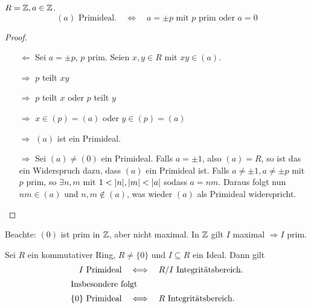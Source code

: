 \documentclass[12pt,a4paper]{scrartcl}
\begin{document}
\begin{bsp}
	$R = \mathbb Z, a\in \mathbb Z$. \[\text{$(a)$ Primideal.} \quad \Longleftrightarrow \quad \text{$a = \pm p$ mit $p$ prim oder $a = 0$} \]
\end{bsp}
\begin{proof}
	\leavevmode
	\begin{itemize}
		\item [\glqq $\Leftarrow$\grqq ]Sei $a = \pm p$, $p$ prim. Seien $x,y\in R$ mit $xy\in (a)$.

		$\Rightarrow$ $p$ teilt $xy$

		$\Rightarrow$ $p$ teilt $x$ oder $p$ teilt $y$

		$\Rightarrow$ $x\in (p) = (a)$ oder $y\in (p) = (a)$

		$\Rightarrow$ $(a)$ ist ein Primideal.
		\item [\glqq $\Rightarrow$\grqq ] Sei $(a) \neq (0)$ ein Primideal. Falls $a = \pm 1$, also $ (a) = R$, so ist das ein Widerspruch dazu, dass $(a)$ ein Primideal ist. Falls $a \neq \pm 1, a\neq \pm p$ mit $p$ prim, so $ \exists n, m$ mit $1<\lvert n\rvert, \lvert m\rvert<\lvert a\rvert$ sodass $a = nm$. 
		Daraus folgt nun $ nm\in (a)$ und $n,m\notin (a)$, was wieder $(a)$ als Primideal widerspricht.
	\end{itemize}
\end{proof}

\begin{bem}
	Beachte: $(0)$ ist prim in $\mathbb Z$, aber nicht maximal. In $\mathbb Z$ gilt \glqq$I$ maximal $\Rightarrow I $ prim\grqq.
\end{bem}


\begin{satz} \label{thm:primitb}
	Sei $R$ ein kommutativer Ring, $R\neq\{0\}$ und $ I\subseteq R$ ein Ideal. Dann gilt
	\begin{align*} I \text{ Primideal} \quad &\Longleftrightarrow \quad R/I \text{ Integritätsbereich}. \\\intertext{Insbesondere folgt}
	 \text{$\{0\}$ Primideal} \quad&\Longleftrightarrow\quad \text{$R$ Integritätsbereich}.\end{align*}
\end{satz}
\end{document}
